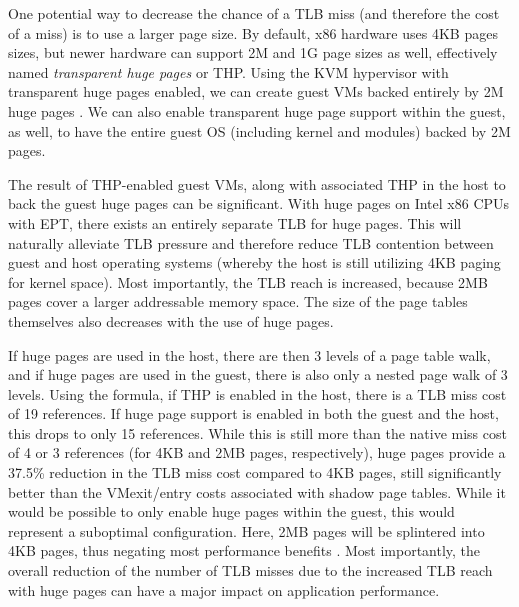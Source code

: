 One potential way to decrease the chance of a TLB miss (and therefore the cost of a miss) is to use a larger page size. By default, x86 hardware uses 4KB pages sizes, but newer hardware can support 2M and 1G page sizes as well, effectively named \emph{transparent huge pages} or THP.  Using the KVM hypervisor with transparent huge pages enabled, we can create guest VMs backed entirely by 2M huge pages \cite{Arcangeli:2010}. We can also enable transparent huge page support within the guest, as well, to have the entire guest OS (including kernel and modules) backed by 2M pages. 

The result of THP-enabled guest VMs, along with associated THP in the host to back the guest huge pages can be significant. With huge pages on Intel x86 CPUs with EPT, there exists an entirely separate TLB for huge pages. This will naturally alleviate TLB pressure and therefore reduce TLB contention between guest and host operating systems (whereby the host is still utilizing 4KB paging for kernel space). Most importantly, the TLB reach is increased, because 2MB pages cover a larger addressable memory space.  The size of the page tables themselves also decreases with the use of huge pages.  

If huge pages are used in the host, there are then 3 levels of a page table walk, and if huge pages are used in the guest, there is also only a nested page walk of 3 levels. Using the formula, if THP is enabled in the host, there is a TLB miss cost of 19 references.  If huge page support is enabled in both the guest and the host, this drops to only 15 references.  While this is still more than the native miss cost of 4 or 3 references (for 4KB and 2MB pages, respectively), huge pages provide a 37.5\% reduction in the TLB miss cost compared to 4KB pages, still significantly better than the VMexit/entry costs associated with shadow page tables.  While it would be possible to only enable huge pages within the guest, this would represent a suboptimal configuration. Here, 2MB pages will be splintered into 4KB pages, thus negating most performance benefits \cite{pham2015splintering}.  Most importantly, the overall reduction of the number of TLB misses due to the increased TLB reach with huge pages can have a major impact on application performance.  


